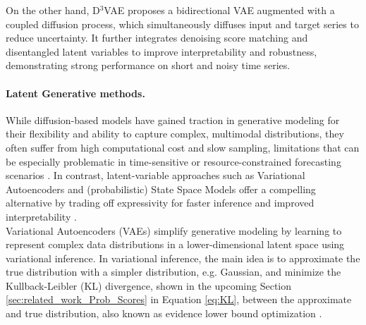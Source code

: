 \documentclass[a4paper,oneside,bibliography=totoc]{scrbook}
\begin{document}
On the other hand, D$^3$VAE \cite{li_generative_2022} proposes a bidirectional VAE augmented with a coupled diffusion process, which simultaneously diffuses input and target series to reduce uncertainty. It further integrates denoising score matching and disentangled latent variables to improve interpretability and robustness, demonstrating strong performance on short and noisy time series.

\paragraph{Latent Generative methods.}
While diffusion-based models have gained traction in generative modeling for their flexibility and ability to capture complex, multimodal distributions, they often suffer from high computational cost and slow sampling, limitations that can be especially problematic in time-sensitive or resource-constrained forecasting scenarios \cite{yegin_generative_2024, yang_survey_2024}. 
In contrast, latent-variable approaches such as Variational Autoencoders and (probabilistic) State Space Models offer a compelling alternative by trading off expressivity for faster inference and improved interpretability \cite{tong_probabilistic_2022, de_bezenac_normalizing_2020}. \\
Variational Autoencoders (VAEs) \cite{kingma_auto-encoding_2014, rezende_stochastic_2014} simplify generative modeling by learning to represent complex data distributions in a lower-dimensional latent space using variational inference. 
In variational inference, the main idea is to approximate the true distribution with a simpler distribution, e.g. Gaussian, and minimize the Kullback-Leibler (KL) divergence, shown in the upcoming Section \ref{sec:related_work_Prob_Scores} in Equation \ref{eq:KL}, between the approximate and true distribution, also known as evidence lower bound optimization \cite{yegin_generative_2024}. 
\end{document}
